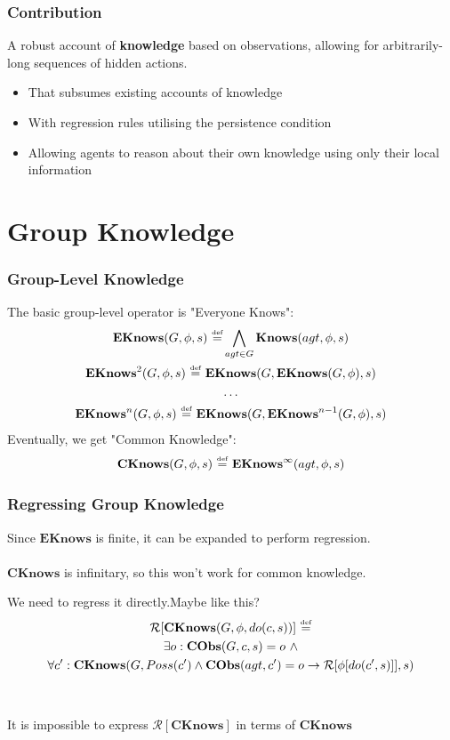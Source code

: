 \documentclass{beamer}
\newcommand{\isdef}{\hbox{$\stackrel{\mbox{\tiny def}}{=}$}}
\begin{document}
\begin{frame}
\frametitle{Contribution}
A robust account of \textbf{knowledge} based on observations, allowing for
arbitrarily-long sequences of hidden actions.
\begin{itemize}
\item That subsumes existing accounts of knowledge
\item With regression rules utilising the persistence condition
\item Allowing agents to reason about their own knowledge using only their local information
\end{itemize}
\end{frame}

\section{Group Knowledge}

\begin{frame}
\frametitle{Group-Level Knowledge}
The basic group-level operator is "Everyone Knows":
\begin{gather*}
\mathbf{EKnows}(G,\phi,s)\ \isdef \bigwedge_{agt \in G} \mathbf{Knows}(agt,\phi,s)\\
\mathbf{EKnows}^{2}(G,\phi,s)\ \isdef\ \mathbf{EKnows}(G,\mathbf{EKnows}(G,\phi),s)\\
\dots \\
\mathbf{EKnows}^{n}(G,\phi,s)\ \isdef\ \mathbf{EKnows}(G,\mathbf{EKnows}^{n-1}(G,\phi),s)
\end{gather*}
\pause
Eventually, we get "Common Knowledge":
\begin{gather*}
\mathbf{CKnows}(G,\phi,s)\ \isdef\ \mathbf{EKnows}^{\infty}(agt,\phi,s)
\end{gather*}
\end{frame}

\begin{frame}
\frametitle{Regressing Group Knowledge}
Since $\mathbf{EKnows}$ is finite, it can be expanded to perform regression.
\ \\
\ \\
$\mathbf{CKnows}$ is infinitary, so this won't work for common knowledge.

We need to regress it directly.\pause Maybe like this?
\begin{multline*}
\mathcal{R}[\mathbf{CKnows}(G,\phi,do(c,s))]\ \isdef \\
\exists o: \mathbf{CObs}(G,c,s)=o\ \wedge\\
\forall c': \mathbf{CKnows}(G,Poss(c') \wedge \mathbf{CObs}(agt,c')=o \rightarrow \mathcal{R}[\phi[do(c',s)]],s)
\end{multline*}
\ \\
\ \\
\pause
It is \alert{impossible} to express $\mathcal{R}[\mathbf{CKnows}]$ in terms of $\mathbf{CKnows}$
\end{frame}
\end{document}
